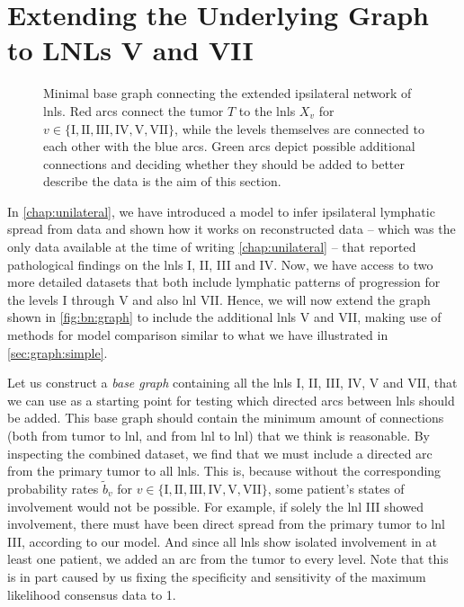 \documentclass[\relativeRoot/main.tex]{subfiles}
\begin{document}
\section[Extending the Underlying Graph to LNLs V and VII]{Extending the Underlying Graph\\to LNLs V and VII}
\label{sec:graph:extended}

\begin{figure}
    \centering
    \def\svgwidth{0.4\textwidth}
    
    \caption[
        Base graph of the extended ipsilateral model with possible additional edges
    ]{
        Minimal base graph connecting the extended ipsilateral network of \glspl{lnl}. Red arcs connect the tumor $T$ to the \glspl{lnl} $X_v$ for $v \in \{ \text{I}, \text{II}, \text{III}, \text{IV}, \text{V}, \text{VII} \}$, while the levels themselves are connected to each other with the blue arcs. Green arcs depict possible additional connections and deciding whether they should be added to better describe the data is the aim of this section.
    }
    \label{fig:graph:extended_graph}
\end{figure}

In \cref{chap:unilateral}, we have introduced a model to infer ipsilateral lymphatic spread from data and shown how it works on reconstructed data -- which was the only data available at the time of writing \cref{chap:unilateral} -- that reported pathological findings on the \glspl{lnl} I, II, III and IV. Now, we have access to two more detailed datasets that both include lymphatic patterns of progression for the levels I through V and also \gls{lnl} VII. Hence, we will now extend the graph shown in \cref{fig:bn:graph} to include the additional \glspl{lnl} V and VII, making use of methods for model comparison similar to what we have illustrated in \cref{sec:graph:simple}.

Let us construct a \emph{base graph} containing all the \glspl{lnl} I, II, III, IV, V and VII, that we can use as a starting point for testing which directed arcs between \glspl{lnl} should be added. This base graph should contain the minimum amount of connections (both from tumor to \gls{lnl}, and from \gls{lnl} to \gls{lnl}) that we think is reasonable. By inspecting the combined dataset, we find that we must include a directed arc from the primary tumor to all \glspl{lnl}. This is, because without the corresponding probability rates $\tilde{b}_v$ for $v \in \{ \text{I}, \text{II}, \text{III}, \text{IV}, \text{V}, \text{VII} \}$, some patient's states of involvement would not be possible. For example, if solely the \gls{lnl} III showed involvement, there must have been direct spread from the primary tumor to \gls{lnl} III, according to our model. And since all \glspl{lnl} show isolated involvement in at least one patient, we added an arc from the tumor to every level. Note that this is in part caused by us fixing the specificity and sensitivity of the maximum likelihood consensus data to 1.
\end{document}
